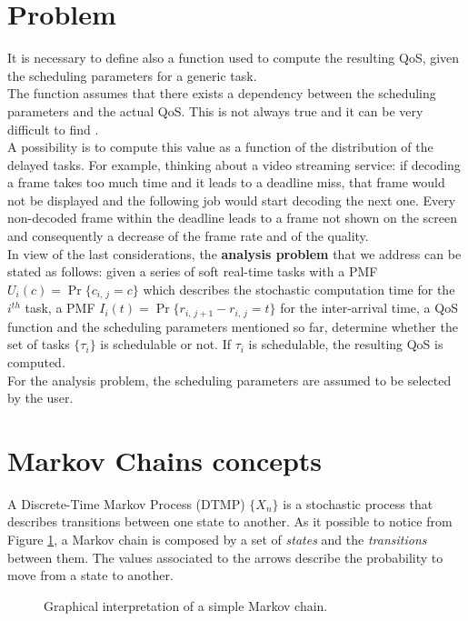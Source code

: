 \section{Problem} \label{problem}
It is necessary to define also a function used to compute the resulting QoS, given the scheduling parameters for a generic task.\\
The function assumes that there exists a dependency between the scheduling parameters and the actual QoS. This is not always true and it can be very difficult to find \cite{prosit}.\\
A possibility is to compute this value as a function of the distribution of the delayed tasks. For example, thinking about a video streaming service: if decoding a frame takes too much time and it leads to a deadline miss, that frame would not be displayed and the following job would start decoding the next one. Every non-decoded frame within the deadline leads to a frame not shown on the screen and consequently a decrease of the frame rate and of the quality.\\
In view of the last considerations, the \textbf{analysis problem} that we address can be stated as follows: given a series of soft real-time tasks with a PMF \( U_{i}(c) = \Pr\{c_{i,\,j} = c\} \) which describes the stochastic computation time for the \( i^{th} \) task, a PMF \( I_{i}(t) = \Pr\{r_{i,\,j+1}-r_{i,\,j} = t\} \) for the inter-arrival time, a QoS function and the scheduling parameters mentioned so far, determine whether the set of tasks \( \{\tau_{i}\} \) is schedulable or not. If \( \tau_{i} \) is schedulable, the resulting QoS is computed.\\
For the analysis problem, the scheduling parameters are assumed to be selected by the user.

\section{Markov Chains concepts} \label{mcconcepts}
A Discrete-Time Markov Process (DTMP) \( \{X_{n}\} \) is a stochastic process that describes transitions between one state to another. As it possible to notice from Figure \ref{automaton}, a Markov chain is composed by a set of \emph{states} and the \emph{transitions} between them. The values associated to the arrows describe the probability to move from a state to another.
\begin{figure}[H]
  \caption{Graphical interpretation of a simple Markov chain.}
  \label{automaton}
\end{figure}


